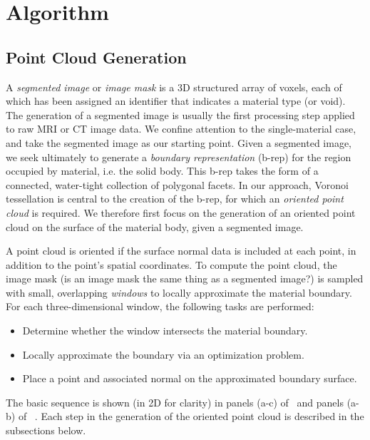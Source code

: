 \section{Algorithm}
%

\subsection{Point Cloud Generation}
\label{Point Cloud Generation}

A \textit{segmented image} or \textit{image mask} is a 3D structured array of voxels, each of which has been assigned an identifier
that indicates a material type (or void).
The generation of a segmented image is usually the first processing step applied
to raw MRI or CT image data.  We confine attention to the single-material case, and take the
segmented image as our starting point.  Given a segmented image, we seek ultimately to generate a {\em boundary representation} (b-rep) for the region occupied by material, i.e. the solid body.  This b-rep takes the form of a connected, water-tight collection of polygonal facets.  In our approach, Voronoi tessellation is central to the creation of the b-rep, for which an {\em oriented point cloud} is required.  We therefore first focus on the generation of an oriented point cloud on the surface of the material body, given a segmented image.

A point cloud is oriented if the surface normal data is included at each point, in addition to the point's spatial coordinates. To compute the point cloud, the image mask (is an image mask the same thing as a segmented image?) is sampled with small, overlapping \textit{windows} to locally approximate the material boundary. For each three-dimensional window, the following tasks are performed:
\vspace{3mm}
\begin{itemize}[noitemsep]
  \item Determine whether the window intersects the material boundary.
  \item Locally approximate the boundary via an optimization problem. 
  \item Place a point and associated normal on the approximated boundary surface.
\end{itemize}
\vspace{3mm}
The basic sequence is shown (in 2D for clarity) in panels (a-c) of~ and panels (a-b) of ~. Each step in the generation of the oriented point cloud is described in the subsections below.

